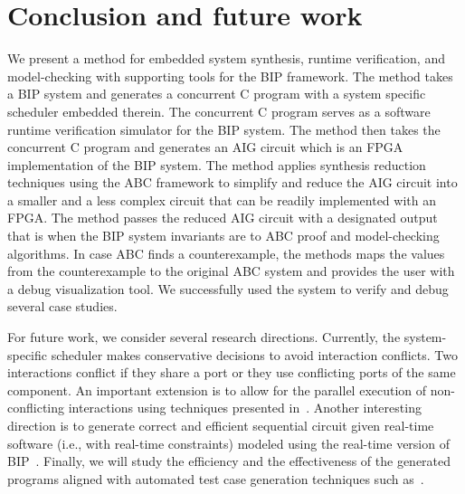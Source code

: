 \section{Conclusion and future work}
\label{sec:conclusion}
%
We present a method for embedded system synthesis, runtime verification,
and model-checking with supporting tools for the BIP framework. 
The method takes a BIP system and generates a concurrent C program with a system 
specific scheduler embedded therein. 
The concurrent C program serves as a software runtime verification simulator for the 
BIP system.
The method then takes the concurrent C program and generates an AIG circuit which is an
FPGA implementation of the BIP system. 
The method applies synthesis reduction techniques using the ABC framework 
to simplify and reduce the AIG circuit
into a smaller and a less complex circuit that can be readily implemented with an 
FPGA. 
The method passes the reduced AIG circuit with a designated output that is \true
when the BIP system invariants are \true to ABC proof and model-checking 
algorithms. In case ABC finds a counterexample, the methods maps the values from 
the counterexample to the original ABC system and provides the user with a debug
visualization tool. 
We successfully used the system to verify and debug several case studies. 


For future work, we consider several research directions.
% 
Currently, the system-specific scheduler makes conservative decisions to avoid interaction conflicts. Two interactions conflict if they share a port or they use conflicting ports of the same component.
An important extension is to allow for the parallel execution of non-conflicting interactions using techniques presented in~\cite{BonakdarpourBJQS12}. Another interesting direction is to generate correct and efficient sequential circuit given real-time software (i.e., with real-time constraints) modeled using the real-time version of BIP~\cite{AbdellatifCS13}. 
%
Finally, we will study the efficiency and the effectiveness of the generated \caig programs aligned with automated test case generation techniques such as~\cite{kbse-BurnimS08}.
